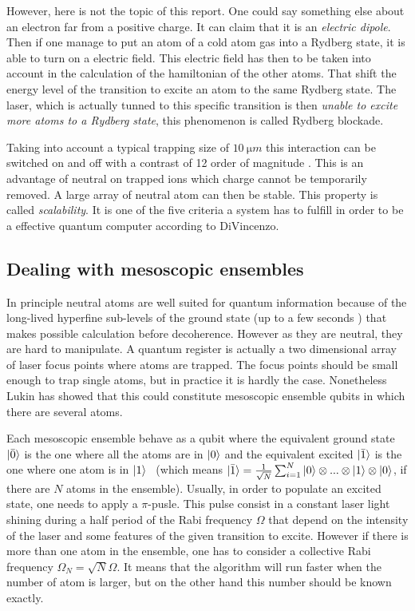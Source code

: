 \documentclass[twoside, open=right
]{scrreprt}
\newcommand{\g}{\ensuremath{\ket{0}}\xspace}
\newcommand{\e}{\ensuremath{\ket{1}}\xspace}
\newcommand{\Om}{\Omega}
\begin{document}
\par However, here is not the topic of this report. One could say something else about an electron far from a positive charge. It can claim that it is an \emph{electric dipole}. Then if one manage to put an atom of a cold atom gas into a Rydberg state, it is able to turn on a electric field. This electric field has then to be taken into account in the calculation of the hamiltonian of the other atoms. That shift the energy level of the transition to excite an atom to the same Rydberg state. The laser, which is actually tunned to this specific transition is then \emph{unable to excite more atoms to a Rydberg state}, this phenomenon is called Rydberg blockade.

\par Taking into account a typical trapping size of $\SI{10}{\micro m}$ this interaction can be switched on and off with a contrast of 12 order of magnitude \cite{Saff-rev}. This is an advantage of neutral on trapped ions which charge cannot be temporarily removed. A large array of neutral atom can then be stable. This property is called \emph{scalability}. It is one of the five criteria a system has to fulfill in order to be a effective quantum computer according to DiVincenzo.

\subsection{Dealing with mesoscopic ensembles}

\par In principle neutral atoms are well suited for quantum information because of the long-lived hyperfine sub-levels of the ground state (up to a few seconds \cite{Lukin}) that makes possible calculation before decoherence. However as they are neutral, they are hard to manipulate. A quantum register is actually a two dimensional array of laser focus points where atoms are trapped. The focus points should be small enough to trap single atoms, but in practice it is hardly the case. Nonetheless Lukin has showed that this could constitute mesoscopic ensemble qubits in which there are several atoms.

\par Each mesoscopic ensemble behave as a qubit where the equivalent ground state $\ket{\bar{0}}$ is the one where all the atoms are in \g and the equivalent excited $\ket{\bar{1}}$ is the one where one atom is in \e ~ (which means $\ket{\bar{1}} = \frac{1}{\sqrt{N}} \sum_{i=1}^N \g \otimes ... \otimes \e \otimes \g$, if there are $N$ atoms in the ensemble). Usually, in order to populate an excited state, one needs to apply a $\pi$-pusle. This pulse consist in a constant laser light shining during a half period of the Rabi frequency $\Om$ that depend on the intensity of the laser and some features of the given transition to excite. However if there is more than one atom in the ensemble, one has to consider a collective Rabi frequency $\Om_N = \sqrt{N} \Om$. It means that the algorithm will run faster when the number of atom is larger, but on the other hand this number should be known exactly.
\end{document}
